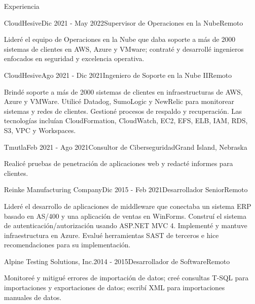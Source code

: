 \documentclass{resume} %
\begin{document}
\begin{rSection}{Experiencia}
\begin{rSubsection}{CloudHesive}{Dic 2021 - May 2022}{Supervisor de Operaciones en la Nube}{Remoto}
\item Lider\'e el equipo de Operaciones en la Nube que daba soporte a m\'as de 2000 sistemas de clientes en AWS, Azure y VMware; contrat\'e y desarroll\'e ingenieros enfocados en seguridad y excelencia operativa.
\end{rSubsection}

\begin{rSubsection}{CloudHesive}{Ago 2021 - Dic 2021}{Ingeniero de Soporte en la Nube II}{Remoto}
\item Brind\'e soporte a m\'as de 2000 sistemas de clientes en infraestructuras de AWS, Azure y VMWare. Utilic\'e Datadog, SumoLogic y NewRelic para monitorear sistemas y redes de clientes. Gestion\'e procesos de respaldo y recuperaci\'on. Las tecnolog\'ias inclu\'ian CloudFormation, CloudWatch, EC2, EFS, ELB, IAM, RDS, S3, VPC y Workspaces.  
\end{rSubsection}

\begin{rSubsection}{Tmutla}{Feb 2021 - Ago 2021}{Consultor de Ciberseguridad}{Grand Island, Nebraska}
\item Realic\'e pruebas de penetraci\'on de aplicaciones web y redact\'e informes para clientes.
\end{rSubsection}

\begin{rSubsection}{Reinke Manufacturing Company}{Dic 2015 - Feb 2021}{Desarrollador Senior}{Remoto} 
\item Lider\'e el desarrollo de aplicaciones de middleware que conectaba un sistema ERP basado en AS/400 y una aplicaci\'on de ventas en WinForms. Constru\'i el sistema de autenticaci\'on/autorizaci\'on usando ASP.NET MVC 4. Implement\'e y mantuve infraestructura en Azure. Evalu\'e herramientas SAST de terceros e hice recomendaciones para su implementaci\'on.
\end{rSubsection}

\begin{rSubsection}{Alpine Testing Solutions, Inc.}{2014 - 2015}{Desarrollador de Software}{Remoto}
\item Monitore\'e y mitigu\'e errores de importaci\'on de datos; cre\'e consultas T-SQL para importaciones y exportaciones de datos; escrib\'i XML para importaciones manuales de datos.
\end{rSubsection}


\end{rSection}
\end{document}
